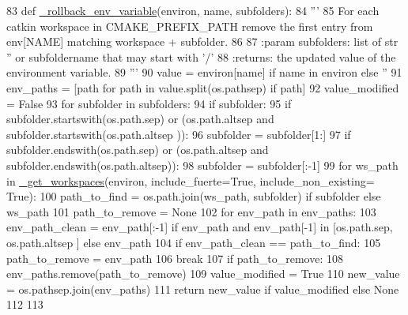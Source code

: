 \begin{DoxyCode}
83 \textcolor{keyword}{def }\hyperlink{namespace__setup__util_af05661e87b3270e8bfd0fbc18a5eeec4}{\_rollback\_env\_variable}(environ, name, subfolders):
84     \textcolor{stringliteral}{'''}
85 \textcolor{stringliteral}{    For each catkin workspace in CMAKE\_PREFIX\_PATH remove the first entry from env[NAME] matching workspace
       + subfolder.}
86 \textcolor{stringliteral}{}
87 \textcolor{stringliteral}{    :param subfolders: list of str '' or subfoldername that may start with '/'}
88 \textcolor{stringliteral}{    :returns: the updated value of the environment variable.}
89 \textcolor{stringliteral}{    '''}
90     value = environ[name] \textcolor{keywordflow}{if} name \textcolor{keywordflow}{in} environ \textcolor{keywordflow}{else} \textcolor{stringliteral}{''}
91     env\_paths = [path \textcolor{keywordflow}{for} path \textcolor{keywordflow}{in} value.split(os.pathsep) \textcolor{keywordflow}{if} path]
92     value\_modified = \textcolor{keyword}{False}
93     \textcolor{keywordflow}{for} subfolder \textcolor{keywordflow}{in} subfolders:
94         \textcolor{keywordflow}{if} subfolder:
95             \textcolor{keywordflow}{if} subfolder.startswith(os.path.sep) \textcolor{keywordflow}{or} (os.path.altsep \textcolor{keywordflow}{and} subfolder.startswith(os.path.altsep
      )):
96                 subfolder = subfolder[1:]
97             \textcolor{keywordflow}{if} subfolder.endswith(os.path.sep) \textcolor{keywordflow}{or} (os.path.altsep \textcolor{keywordflow}{and} subfolder.endswith(os.path.altsep)):
98                 subfolder = subfolder[:-1]
99         \textcolor{keywordflow}{for} ws\_path \textcolor{keywordflow}{in} \hyperlink{namespace__setup__util_ab2be07aa31918f1e1e34d6b7c4d66fcb}{\_get\_workspaces}(environ, include\_fuerte=\textcolor{keyword}{True}, include\_non\_existing=\textcolor{keyword}{
      True}):
100             path\_to\_find = os.path.join(ws\_path, subfolder) \textcolor{keywordflow}{if} subfolder \textcolor{keywordflow}{else} ws\_path
101             path\_to\_remove = \textcolor{keywordtype}{None}
102             \textcolor{keywordflow}{for} env\_path \textcolor{keywordflow}{in} env\_paths:
103                 env\_path\_clean = env\_path[:-1] \textcolor{keywordflow}{if} env\_path \textcolor{keywordflow}{and} env\_path[-1] \textcolor{keywordflow}{in} [os.path.sep, os.path.altsep
      ] \textcolor{keywordflow}{else} env\_path
104                 \textcolor{keywordflow}{if} env\_path\_clean == path\_to\_find:
105                     path\_to\_remove = env\_path
106                     \textcolor{keywordflow}{break}
107             \textcolor{keywordflow}{if} path\_to\_remove:
108                 env\_paths.remove(path\_to\_remove)
109                 value\_modified = \textcolor{keyword}{True}
110     new\_value = os.pathsep.join(env\_paths)
111     \textcolor{keywordflow}{return} new\_value \textcolor{keywordflow}{if} value\_modified \textcolor{keywordflow}{else} \textcolor{keywordtype}{None}
112 
113 
\end{DoxyCode}


